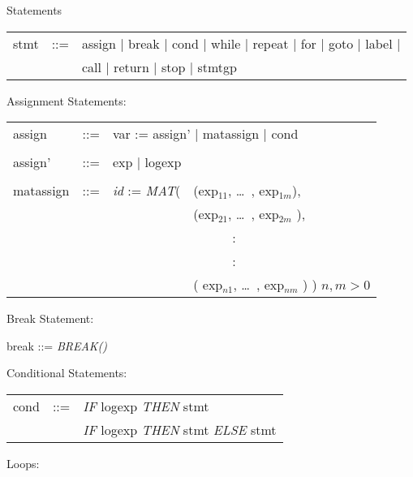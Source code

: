 \begin{describe}{Statements}
\begin{tabular}{lll}
stmt & ::= & assign  $\mid$  break  $\mid$  cond  $\mid$  while $\mid$
           repeat  $\mid$  for  $\mid$  goto  $\mid$  label $\mid$ \\
& &   call  $\mid$  return  $\mid$  stop  $\mid$  stmtgp \\
\end{tabular}

Assignment Statements:

\begin{tabular}{llll}
assign & ::= & \multicolumn{2}{l}{var := assign'  $\mid$  matassign $\mid$
 cond}\\
& & & \\
assign' & ::= & \multicolumn{2}{l}{exp  $\mid$  logexp}\\
& & & \\
matassign & ::= & {\it id} := {\it MAT\/}(&(exp$_{11}$, \dots\ , exp$_{1m}$),\\
 & & &(exp$_{21}$, \dots\ , exp$_{2m}$ ),\\
 & & & \ \ \ \ \ \ :\\
 & & & \ \ \ \ \ \ :\\
 & & &( exp$_{n1}$, \dots\ , exp$_{nm}$ ) ) $n,m > 0$ \\
\end{tabular}

Break Statement:

break  ::= {\it BREAK()}

Conditional Statements:

\begin{tabular}{lll}
cond & ::= & {\it IF\/} logexp {\it THEN\/} stmt\\
& & {\it IF\/} logexp {\it THEN\/} stmt {\it ELSE\/} stmt\\
\end{tabular}

Loops:
  


\end{describe}

